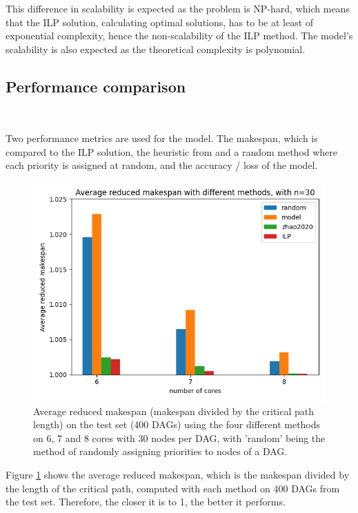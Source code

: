 This difference in scalability is expected as the problem is NP-hard,
which means that the ILP solution, calculating optimal solutions,
has to be at least of exponential complexity, hence the non-scalability of the ILP method.
The model's scalability is also expected as the theoretical complexity
is polynomial.


\subsection{Performance comparison}
~

Two performance metrics are used for the model.
The makespan, which is compared to the ILP solution, the heuristic
from \citet{zhao2020DAGsched} and a random method where each priority is assigned at random,
and the accuracy / loss of the model.

\begin{figure}
    \centering
    \includegraphics[width=\linewidth]{images/avg_makespan_n30.png}
    \caption{Average reduced makespan (makespan divided by the critical path length) on the test set (400 DAGs) using the four different methods
    on 6, 7 and 8 cores with 30 nodes per DAG,
    with 'random' being the method of randomly assigning priorities to nodes of a DAG.}
    \label{fig:avg_makespan_comparison_trained}
\end{figure}

Figure \ref{fig:avg_makespan_comparison_trained} shows the average
reduced makespan, which is the makespan divided by the length of the critical path,
computed with each method on 400 DAGs from the test set.
Therefore, the closer it is to 1, the better it performs.

